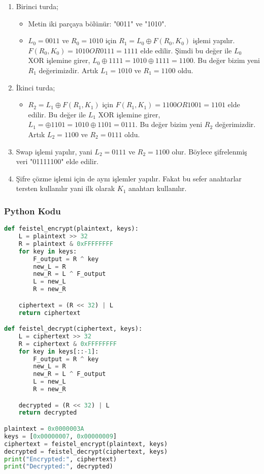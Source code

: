 \begin{enumerate}
    \item Birinci turda;
    \begin{itemize}
        \item Metin iki parçaya bölünür: "0011" ve "1010".
        \item $L_0 = 0011$ ve $R_0 = 1010$ için $R_1 = L_0 \oplus F(R_0, K_0)$ işlemi yapılır. $F(R_0, K_0) = 1010 OR 0111 = 1111$ elde edilir. Şimdi bu değer ile $L_0$ XOR işlemine girer, $L_0 \oplus 1111 = 1010 \oplus 1111 = 1100$. Bu değer bizim yeni $R_1$ değerimizdir. Artık $L_1 = 1010$ ve $R_1 = 1100$ oldu. 
    \end{itemize}
    \item İkinci turda;
    \begin{itemize}
        \item $R_2 = L_1 \oplus F(R_1, K_1)$ için $F(R_1, K_1) = 1100 OR 1001 = 1101$ elde edilir. Bu değer ile $L_1$ XOR işlemine girer, $L_1 = \oplus 1101 = 1010 \oplus 1101 = 0111$. Bu değer bizim yeni $R_2$ değerimizdir. Artık $L_2 = 1100$ ve $R_2 = 0111$ oldu. 
    \end{itemize}
    \item Swap işlemi yapılır, yani $L_2 = 0111$ ve $R_2 = 1100$ olur. Böylece şifrelenmiş veri "01111100" elde edilir.
    \item Şifre çözme işlemi için de aynı işlemler yapılır. Fakat bu sefer anahtarlar tersten kullanılır yani ilk olarak $K_1$ anahtarı kullanılır.
\end{enumerate}

\subsubsection{Python Kodu}

\begin{lstlisting}[language=Python]
def feistel_encrypt(plaintext, keys):
    L = plaintext >> 32
    R = plaintext & 0xFFFFFFFF
    for key in keys:
        F_output = R ^ key
        new_L = R
        new_R = L ^ F_output
        L = new_L
        R = new_R

    ciphertext = (R << 32) | L
    return ciphertext

def feistel_decrypt(ciphertext, keys):
    L = ciphertext >> 32
    R = ciphertext & 0xFFFFFFFF
    for key in keys[::-1]:
        F_output = R ^ key
        new_L = R
        new_R = L ^ F_output
        L = new_L
        R = new_R

    decrypted = (R << 32) | L
    return decrypted

plaintext = 0x0000003A
keys = [0x00000007, 0x00000009]
ciphertext = feistel_encrypt(plaintext, keys)
decrypted = feistel_decrypt(ciphertext, keys)
print("Encrypted:", ciphertext)
print("Decrypted:", decrypted)
\end{lstlisting}

